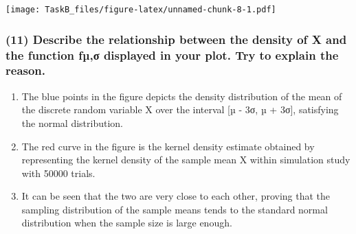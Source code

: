 \documentclass[
]{article}
\providecommand{\tightlist}{%
  \setlength{\itemsep}{0pt}\setlength{\parskip}{0pt}}
\begin{document}
\texttt{[image: TaskB\_files/figure-latex/unnamed-chunk-8-1.pdf]}

\subsubsection{(11) Describe the relationship between the density of X
and the function fµ,σ displayed in your plot. Try to explain the
reason.}\label{describe-the-relationship-between-the-density-of-x-and-the-function-fuxb5ux3c3-displayed-in-your-plot.-try-to-explain-the-reason.}

\begin{enumerate}
\def\labelenumi{(\roman{enumi})}
\tightlist
\item
  The blue points in the figure depicts the density distribution of the
  mean of the discrete random variable X over the interval {[}µ - 3σ, µ
  + 3σ{]}, satisfying the normal distribution.
\item
  The red curve in the figure is the kernel density estimate obtained by
  representing the kernel density of the sample mean X within simulation
  study with 50000 trials.
\item
  It can be seen that the two are very close to each other, proving that
  the sampling distribution of the sample means tends to the standard
  normal distribution when the sample size is large enough.
\end{enumerate}
\end{document}
